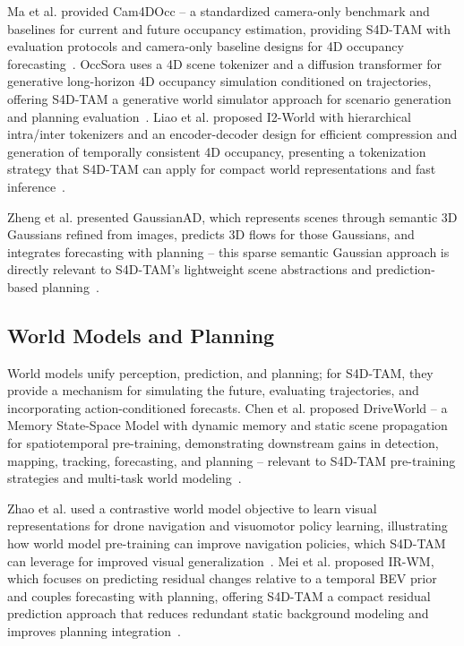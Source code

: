 Ma et al. provided Cam4DOcc -- a standardized camera-only benchmark and baselines for current and future occupancy estimation, providing S4D-TAM with evaluation protocols and camera-only baseline designs for 4D occupancy forecasting~\cite{ma2023cam4docc}. OccSora uses a 4D scene tokenizer and a diffusion transformer for generative long-horizon 4D occupancy simulation conditioned on trajectories, offering S4D-TAM a generative world simulator approach for scenario generation and planning evaluation~\cite{wang2024occsora}. Liao et al. proposed I2-World with hierarchical intra/inter tokenizers and an encoder-decoder design for efficient compression and generation of temporally consistent 4D occupancy, presenting a tokenization strategy that S4D-TAM can apply for compact world representations and fast inference~\cite{liao2025i2world}.

Zheng et al. presented GaussianAD, which represents scenes through semantic 3D Gaussians refined from images, predicts 3D flows for those Gaussians, and integrates forecasting with planning -- this sparse semantic Gaussian approach is directly relevant to S4D-TAM's lightweight scene abstractions and prediction-based planning~\cite{zheng2024gaussianad}.

\subsection{World Models and Planning}
\label{subsec:world_models}

World models unify perception, prediction, and planning; for S4D-TAM, they provide a mechanism for simulating the future, evaluating trajectories, and incorporating action-conditioned forecasts. Chen et al. proposed DriveWorld -- a Memory State-Space Model with dynamic memory and static scene propagation for spatiotemporal pre-training, demonstrating downstream gains in detection, mapping, tracking, forecasting, and planning -- relevant to S4D-TAM pre-training strategies and multi-task world modeling~\cite{chen2024driveworld}.

Zhao et al. used a contrastive world model objective to learn visual representations for drone navigation and visuomotor policy learning, illustrating how world model pre-training can improve navigation policies, which S4D-TAM can leverage for improved visual generalization~\cite{zhao2023learning}. Mei et al. proposed IR-WM, which focuses on predicting residual changes relative to a temporal BEV prior and couples forecasting with planning, offering S4D-TAM a compact residual prediction approach that reduces redundant static background modeling and improves planning integration~\cite{mei2025irwm}.

